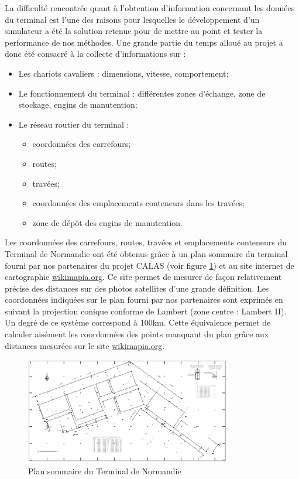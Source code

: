La difficulté rencontrée quant à l'obtention d'information concernant les données du terminal est l'une des raisons pour lesquelles le développement d'un simulateur a été la solution retenue pour de mettre au point et tester la performance de nos méthodes. Une grande partie du temps alloué au projet a donc été consacré à la collecte d'informations sur : 
\begin{itemize}
 \item Les chariots cavaliers : dimensions, vitesse, comportement;
 \item Le fonctionnement du terminal : différentes zones d'échange, zone de stockage, engins de manutention;
 \item Le réseau routier du terminal : 
  \begin{itemize}
   \item coordonnées des carrefours;
   \item routes;
   \item travées;
   \item coordonnées des emplacements conteneurs dans les travées;
   \item zone de dépôt des engins de manutention.
  \end{itemize}
\end{itemize}

Les coordonnées des carrefours, routes, travées et emplacements conteneurs du Terminal de Normandie ont été obtenus grâce à un plan sommaire du terminal fourni par nos partenaires du projet CALAS (voir figure \ref{fig:planTerminalSommaire}) et au site internet de cartographie \href{http://wikimapia.org/\#lat=49.4694697\&lon=0.1676486\&z=16\&l=2\&m=b}{wikimapia.org}. Ce site permet de mesurer de façon relativement précise des distances sur des photos satellites d'une grande définition. Les coordonnées indiquées sur le plan fourni par nos partenaires sont exprimés en suivant la projection conique conforme de Lambert (zone centre : Lambert II). Un degré de ce système correspond à 100km. Cette équivalence permet de calculer aisément les coordonnées des points manquant du plan grâce aux distances mesurées sur le site \href{http://wikimapia.org/\#lat=49.4694697\&lon=0.1676486\&z=16\&l=2\&m=b}{wikimapia.org}.

\begin{figure}[ht]
\centering
 \includegraphics[width=0.8\textwidth]{./chapitres/simulation/planTerminalSommaire.png}
  \caption{Plan sommaire du Terminal de Normandie}
  \label{fig:planTerminalSommaire}
\end{figure}

